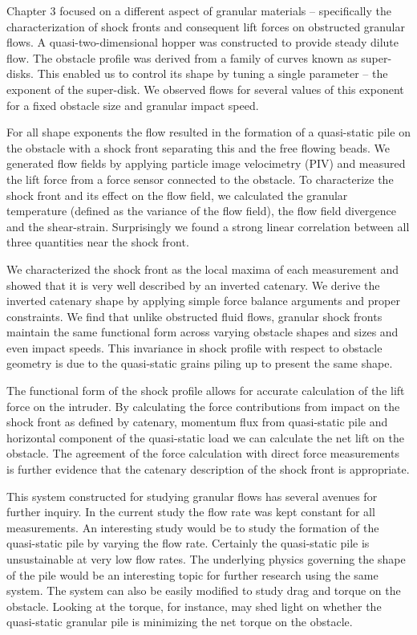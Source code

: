 Chapter 3 focused on a different aspect of granular materials – specifically the characterization of shock fronts and consequent lift forces on obstructed granular flows. A quasi-two-dimensional hopper was constructed to provide steady dilute flow. The obstacle profile was derived from a family of curves known as super-disks. This enabled us to control its shape by tuning a single parameter – the exponent of the super-disk. We observed flows for several values of this exponent for a fixed obstacle size and granular impact speed. 

For all shape exponents the flow resulted in the formation of a quasi-static pile on the obstacle with a shock front separating this and the free flowing beads. We generated flow fields by applying particle image velocimetry (PIV) and measured the lift force from a force sensor connected to the obstacle. To characterize the shock front and its effect on the flow field, we calculated the granular temperature (defined as the variance of the flow field), the flow field divergence and the shear-strain. Surprisingly we found a strong linear correlation between all three quantities near the shock front. 

We characterized the shock front as the local maxima of each measurement and showed that it is very well described by an inverted catenary. We derive the inverted catenary shape by applying simple force balance arguments and proper constraints. We find that unlike obstructed fluid flows, granular shock fronts maintain the same functional form across varying obstacle shapes and sizes and even impact speeds. This invariance in shock profile with respect to obstacle geometry is due to the quasi-static grains piling up to present the same shape. 

The functional form of the shock profile allows for accurate calculation of the lift force on the intruder. By calculating the force contributions from impact on the shock front as defined by catenary, momentum flux from quasi-static pile and horizontal component of the quasi-static load we can calculate the net lift on the obstacle. The agreement of the force calculation with direct force measurements is further evidence that the catenary description of the shock front is appropriate. 

This system constructed for studying granular flows has several avenues for further inquiry. In the current study the flow rate was kept constant for all measurements. An interesting study would be to study the formation of the quasi-static pile by varying the flow rate. Certainly the quasi-static pile is unsustainable at very low flow rates. The underlying physics governing the shape of the pile would be an interesting topic for further research using the same system. The system can also be easily modified to study drag and torque on the obstacle. Looking at the torque, for instance, may shed light on whether the quasi-static granular pile is minimizing the net torque on the obstacle.

